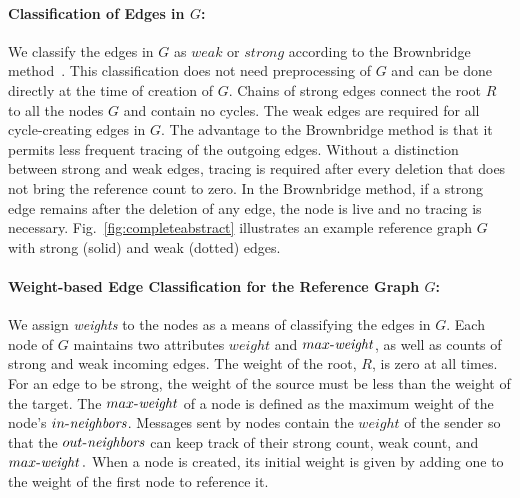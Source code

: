 \paragraph{Classification of Edges in $G$:}
We classify the edges in $G$ as $weak$ or $strong$ according to the Brownbridge method~\cite{Brownbridge1985}.
This classification does not need preprocessing of $G$ and can be done directly at the time of creation of $G$.
Chains of strong edges connect the root $R$ to all the nodes $G$ and contain
no cycles. The weak edges
are required for all cycle-creating edges in $G$. The advantage to the Brownbridge
method is that it permits less frequent
tracing of the outgoing edges. Without a distinction between strong and weak edges,
tracing is required after every deletion that does not bring the reference count to zero.
In the Brownbridge method, if a strong edge remains after the deletion of any edge,
the node is live and no tracing
is necessary.
Fig.~\ref{fig:completeabstract} illustrates an example reference graph $G$ with strong (solid) and weak (dotted) edges.

\paragraph{Weight-based Edge Classification for the Reference Graph $G$:} We assign {\em weights} to the nodes as a means of classifying the edges in $G$.
Each node of $G$ maintains two attributes %
$weight$ and $\mathop{\mbox{$max$-$\mathit{weight}$}}$, as well as counts of strong and weak incoming edges. %
The weight of the root, $R$, is zero at all times. For
an edge to
be strong, the weight of the source must be less than the weight of the
target.
The
$\mathop{\mbox{$max$-$\mathit{weight}$}}$ of a node is defined as the maximum weight of the node's
$\mathop{\mbox{$in$-$\mathit{neighbors}$}}$. Messages sent by nodes contain
the $weight$ of the sender so that the $\mathop{\mbox{$out$-$\mathit{neighbors}$}}$ can keep track of their
strong count, weak count, and $\mathop{\mbox{$max$-$\mathit{weight}$}}.$
When a
node is created, its initial weight is given by adding one to the weight of the
first node to reference it.

